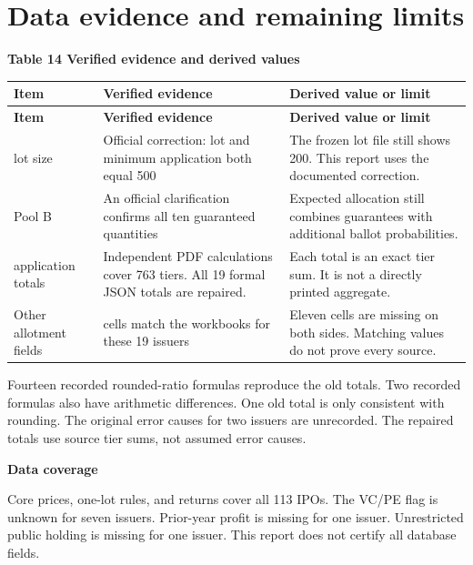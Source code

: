 \documentclass[10pt,a4paper]{article}
\begin{document}
\section*{Data evidence and remaining limits}
\par\addvspace{5pt}
\noindent\textbf{Table 14  Verified evidence and derived values}
\par\nobreak\vspace{2pt}
{\small
\setlength{\tabcolsep}{4pt}
\renewcommand{\arraystretch}{1.08}
\setlength{\LTpre}{0pt}\setlength{\LTpost}{3pt}
\begin{longtable}{@{}>{\raggedright\arraybackslash}p{2.9008cm}>{\raggedleft\arraybackslash}p{6.4784cm}>{\raggedleft\arraybackslash}p{7.0585cm}@{}}
\toprule
\textbf{Item} & \textbf{Verified evidence} & \textbf{Derived value or limit} \\
\midrule\endfirsthead
\toprule
\textbf{Item} & \textbf{Verified evidence} & \textbf{Derived value or limit} \\
\midrule\endhead
\bottomrule\endfoot
2649 lot size & Official correction: lot and minimum application both equal 500 & The frozen lot file still shows 200. This report uses the documented correction. \\
3355 Pool B & An official clarification confirms all ten guaranteed quantities & Expected allocation still combines guarantees with additional ballot probabilities. \\
19 application totals & Independent PDF calculations cover 763 tiers. All 19 formal JSON totals are repaired. & Each total is an exact tier sum. It is not a directly printed aggregate. \\
Other allotment fields & 342 cells match the workbooks for these 19 issuers & Eleven cells are missing on both sides. Matching values do not prove every source. \\
\end{longtable}
}\par\addvspace{3pt}
Fourteen recorded rounded-ratio formulas reproduce the old totals. Two recorded formulas also have arithmetic differences. One old total is only consistent with rounding. The original error causes for two issuers are unrecorded. The repaired totals use source tier sums, not assumed error causes.


\par\addvspace{4pt}\textbf{Data coverage}\par\nobreak
Core prices, one-lot rules, and returns cover all 113 IPOs. The VC/PE flag is unknown for seven issuers. Prior-year profit is missing for one issuer. Unrestricted public holding is missing for one issuer. This report does not certify all database fields.
\end{document}
